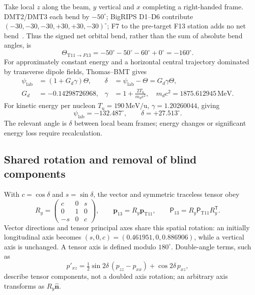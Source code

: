 \documentclass[11pt,a4paper]{article}
\newcommand{\pvec}{\bm p}
\newcommand{\Pt}{\mathsf P}
\begin{document}
Take local $z$ along the beam, $y$ vertical and $x$ completing a right-handed frame. DMT2/DMT3 each bend by $-50^\circ$; BigRIPS D1--D6 contribute $(-30,-30,-30,+30,+30,-30)^\circ$; F7 to the pre-target F13 station adds no net bend~\cite{local,geometry}. Thus the signed net orbital bend, rather than the sum of absolute bend angles, is
\begin{equation}
 \Theta_{\mathrm{T11}\to F13}=-50^\circ-50^\circ-60^\circ+0^\circ=-160^\circ.
\end{equation}
For approximately constant energy and a horizontal central trajectory dominated by transverse dipole fields, Thomas--BMT gives~\cite{bmt,constants}
\begin{align}
 \psi_{\mathrm{lab}}&=(1+G_d\gamma)\Theta,&
 \delta&=\psi_{\mathrm{lab}}-\Theta=G_d\gamma\Theta,\\
 G_d&=-0.14298726968,&
 \gamma&=1+\frac{2T_u}{m_dc^2},\quad m_dc^2=1875.612945\,\mathrm{MeV}.
\end{align}
For kinetic energy per nucleon $T_u=190\,\mathrm{MeV/u}$, $\gamma=1.20260044$, giving
\begin{equation}
 \psi_{\mathrm{lab}}=-132.487^\circ,\qquad \boxed{\delta=+27.513^\circ.}
\end{equation}
The relevant angle is $\delta$ between local beam frames; energy changes or significant energy loss require recalculation.

\subsection{Shared rotation and removal of blind components}

With $c=\cos\delta$ and $s=\sin\delta$, the vector and symmetric traceless tensor obey
\begin{equation}
 R_y=\begin{pmatrix}c&0&s\\0&1&0\\-s&0&c\end{pmatrix},\qquad
 \pvec_{13}=R_y\pvec_{\mathrm{T11}},\qquad
 \Pt_{13}=R_y\Pt_{\mathrm{T11}}R_y^{\mathsf T}.
\end{equation}
Vector directions and tensor principal axes share this spatial rotation: an initially longitudinal axis becomes $(s,0,c)=(0.461951,0,0.886906)$, while a vertical axis is unchanged. A tensor axis is defined modulo $180^\circ$. Double-angle terms, such as
\begin{equation}
 p'_{xz}=\tfrac12\sin2\delta\,(p_{zz}-p_{xx})+\cos2\delta\,p_{xz},
\end{equation}
describe tensor components, not a doubled axis rotation; an arbitrary axis transforms as $R_y\hat{\bm n}$.
\end{document}
